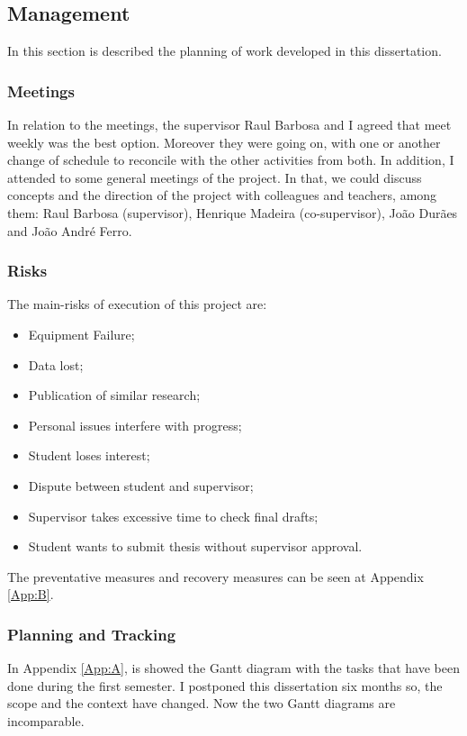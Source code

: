 \subsection{Management}

In this section is described the planning of work developed in this dissertation.

\subsubsection{Meetings}
In relation to the meetings, the supervisor Raul Barbosa and I agreed that meet weekly was the best option. Moreover they were going on, with one or another change of schedule to reconcile with the other activities from both. In addition, I attended to some general meetings of the project. In that, we could discuss concepts and the direction of the project with colleagues and teachers, among them: Raul Barbosa (supervisor), Henrique Madeira (co-supervisor), João Durães and João André Ferro.

\subsubsection{Risks}

The main-risks of execution of this project are:


\begin{itemize}
	\item Equipment Failure;
	\item Data lost;
	\item Publication of similar research;
	\item Personal issues interfere with progress;
	\item Student loses interest;
	\item Dispute between student and supervisor;
	\item Supervisor takes excessive time to check final drafts;
	\item Student wants to submit thesis without supervisor approval.
\end{itemize}


The preventative measures and recovery measures can be seen at Appendix \ref{App:B}.

\subsubsection{Planning and Tracking}
In Appendix \ref{App:A}, is showed the Gantt diagram with the tasks that have been done during the first semester.
I postponed this dissertation six months so, the scope and the context have changed. Now the two Gantt diagrams are incomparable.


